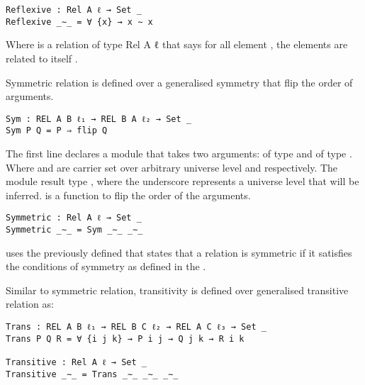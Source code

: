 \begin{verbatim}
Reflexive : Rel A ℓ → Set _
Reflexive _∼_ = ∀ {x} → x ∼ x
\end{verbatim}

Where  is a relation of type {Rel A ℓ} that says for all element
, the elements are related to itself .

Symmetric relation is defined over a generalised symmetry that flip the order of arguments.

\begin{verbatim}
Sym : REL A B ℓ₁ → REL B A ℓ₂ → Set _
Sym P Q = P ⇒ flip Q
\end{verbatim}
The first line declares a module  that takes two arguments:
 of type  and  of type . Where  and  are carrier set over arbitrary universe
level  and  respectively. The module result type , where the underscore represents a universe level that will be inferred.
 is a function to flip the order of the arguments.

\begin{verbatim}
Symmetric : Rel A ℓ → Set _
Symmetric _∼_ = Sym _∼_ _∼_
\end{verbatim}

 uses the previously defined  that states that a
relation  is symmetric if it satisfies the conditions of symmetry as
defined in the .

Similar to symmetric relation, transitivity is defined over generalised transitive relation as:

\begin{verbatim}
Trans : REL A B ℓ₁ → REL B C ℓ₂ → REL A C ℓ₃ → Set _
Trans P Q R = ∀ {i j k} → P i j → Q j k → R i k

Transitive : Rel A ℓ → Set _
Transitive _∼_ = Trans _∼_ _∼_ _∼_
\end{verbatim}

